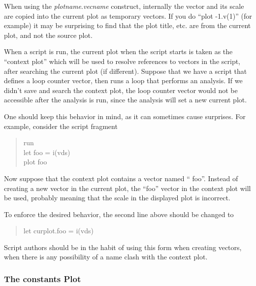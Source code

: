 When using the {\it plotname\/}.{\it vecname} construct, internally
the vector and its scale are copied into the current plot as temporary
vectors.  If you do ``{\vt plot -1.v(1)}'' (for example) it may be
surprising to find that the plot title, etc.  are from the current
plot, and not the source plot.

When a script is run, the current plot when the script starts is taken
as the ``context plot'' which will be used to resolve references to
vectors in the script, after searching the current plot (if
different).  Suppose that we have a script that defines a loop counter
vector, then runs a loop that performs an analysis.  If we didn't save
and search the context plot, the loop counter vector would not be
accessible after the analysis is run, since the analysis will set a
new current plot.

One should keep this behavior in mind, as it can sometimes cause
surprises.  For example, consider the script fragment

\begin{quote} \vt
run\\
let foo = i(vds)\\
plot foo
\end{quote}

Now suppose that the context plot contains a vector named ``{\vt
foo}''.  Instead of creating a new vector in the current plot, the
``{\vt foo}'' vector in the context plot will be used, probably
meaning that the scale in the displayed plot is incorrect.

To enforce the desired behavior, the second line above should be
changed to
\begin{quote} \vt
let curplot.foo = i(vds)
\end{quote}

Script authors should be in the habit of using this form when creating
vectors, when there is any possibility of a name clash with the
context plot.

\subsubsection{The {\vt constants} Plot}


